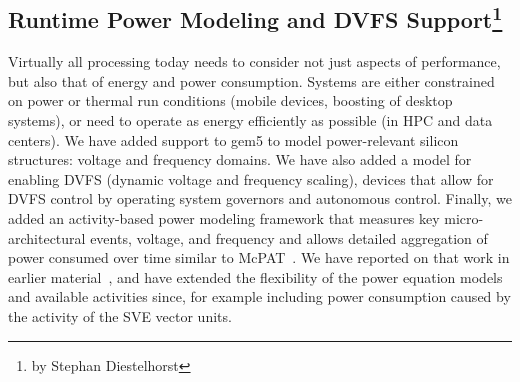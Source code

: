 \subsection[Runtime Power Modeling and DVFS Support]{Runtime Power Modeling and DVFS Support\footnote{by Stephan Diestelhorst}}
\label{sec:dvfs}

Virtually all processing today needs to consider not just aspects of performance, but also that of energy and power consumption. Systems are either constrained on power or thermal run conditions (mobile devices, boosting of desktop systems), or need to operate as energy efficiently as possible (in HPC and data centers).
We have added support to gem5 to model power-relevant silicon structures: voltage and frequency domains.
We have also added a model for enabling DVFS (dynamic voltage and frequency scaling), devices that allow for DVFS control by operating system governors and autonomous control.
Finally, we added an activity-based power modeling framework that measures key micro-architectural events, voltage, and frequency and allows detailed aggregation of power consumed over time similar to McPAT~\cite{LiAhn2009-mcpat, LiAhn2013-mcpat}.
We have reported on that work in earlier material~\cite{SpiliopoulosBHAK13}, and have extended the flexibility of the power equation models and available activities since, for example including power consumption caused by the activity of the SVE vector units.
